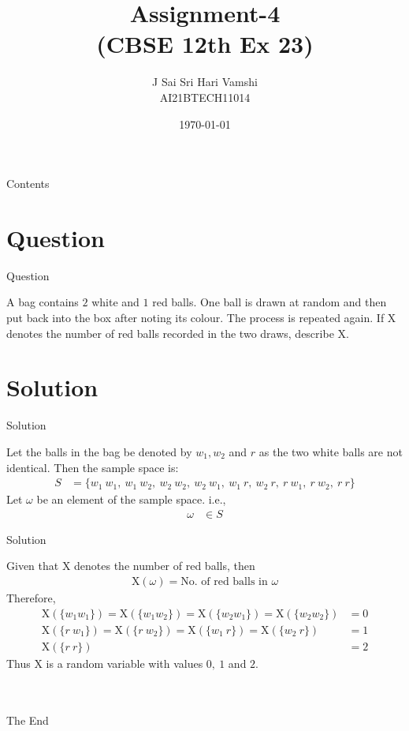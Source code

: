 \documentclass{beamer}
\title{Assignment-4\\(CBSE 12th Ex 23)}
\author{J Sai Sri Hari Vamshi\\ AI21BTECH11014}
\date{\today}
\providecommand{\x}[1]{\ensuremath{\text{X}\left(#1\right)}}
\begin{document}
\begin{frame}
    \titlepage 
\end{frame}



\begin{frame}{Contents}
    \tableofcontents
\end{frame}

\section{Question}
\begin{frame}{Question}

A bag contains $2$ white and $1$ red balls. One ball is drawn at random and then put back into the box after noting its colour. The process is repeated again. If X denotes the number of red balls recorded in the two draws, describe X.

\end{frame}

\section{Solution}
\begin{frame}{Solution}

Let the balls in the bag be denoted by $w_1, w_2$ and $r$ as the two white balls are not identical.
Then the sample space is:
	\begin{align*}
		S & = \{w_1\ w_1,\ w_1\ w_2,\ w_2\ w_2,\ w_2\ w_1,\ w_1\ r,\ w_2\ r,\ r\ w_1,\ r\ w_2,\ r\ r\}
	\end{align*}
Let $\omega$ be an element of the sample space. i.e.,
	\begin{align*}
		\omega & \in S
	\end{align*}
\end{frame}

\begin{frame}{Solution}

Given that X denotes the number of red balls, then 
	\begin{align*}
	\x{\omega} = \text{No. of red balls in }\omega
	\end{align*}
Therefore,
	\begin{align*}
	\x{\{w_1 w_1\}} = \x{\{w_1 w_2\}} = \x{\{w_2 w_1\}} = \x{\{w_2 w_2\}} & = 0\\
	\x{\{r\ w_1\}} = \x{\{r\ w_2\}} = \x{\{w_1\ r\}} = \x{\{w_2\ r\}} & = 1\\
	\x{\{r\ r\}} & = 2
	\end{align*}
Thus X is a random variable with values $0,\ 1$ and $2$.

\end{frame}


\begin{frame}
\centering
\ \\ \ \\
\large The End
\end{frame}
\end{document}
